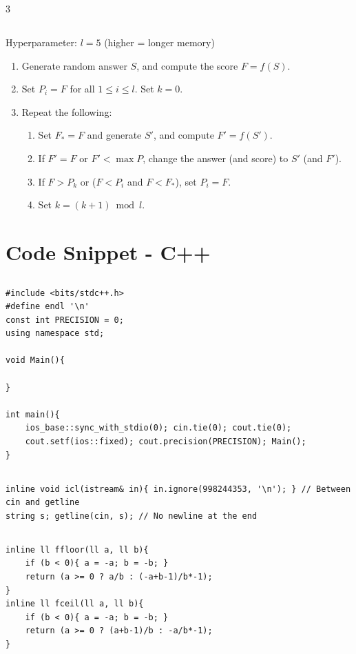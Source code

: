 \documentclass[landscape, 8pt, a4paper, oneside]{extarticle}
\begin{document}
\begin{multicols*}{3}
\subsection{}
Hyperparameter: $l = 5$ (higher = longer memory)
\begin{enumerate}
	\item Generate random answer $S$, and compute the score $F = f(S)$.
	\item Set $P_i = F$ for all $1 \le i \le l$. Set $k = 0$.
	\item Repeat the following:
	\begin{enumerate}
		\item Set $F_{*} = F$ and generate $S'$, and compute $F' = f(S')$.
		\item If $F' = F$ or $F' < \max P$, change the answer (and score) to $S'$ (and $F'$).
		\item If $F > P_k$ or ($F < P_i$ and $F < F_{*}$), set $P_i = F$.
		\item Set $k = (k+1) \bmod l$.
	\end{enumerate}
\end{enumerate}
\section{Code Snippet - C++}
\subsection{}
\begin{verbatim}
#include <bits/stdc++.h>
#define endl '\n'
const int PRECISION = 0;
using namespace std;

void Main(){
	
}

int main(){
	ios_base::sync_with_stdio(0); cin.tie(0); cout.tie(0);
	cout.setf(ios::fixed); cout.precision(PRECISION); Main();
}
\end{verbatim}
\subsection{}
\begin{verbatim}
inline void icl(istream& in){ in.ignore(998244353, '\n'); } // Between cin and getline
string s; getline(cin, s); // No newline at the end
\end{verbatim}
\subsection{}
\begin{verbatim}
inline ll ffloor(ll a, ll b){
	if (b < 0){ a = -a; b = -b; }
	return (a >= 0 ? a/b : (-a+b-1)/b*-1);
}
inline ll fceil(ll a, ll b){
	if (b < 0){ a = -a; b = -b; }
	return (a >= 0 ? (a+b-1)/b : -a/b*-1);
}
\end{verbatim}

\end{multicols*}
\end{document}
